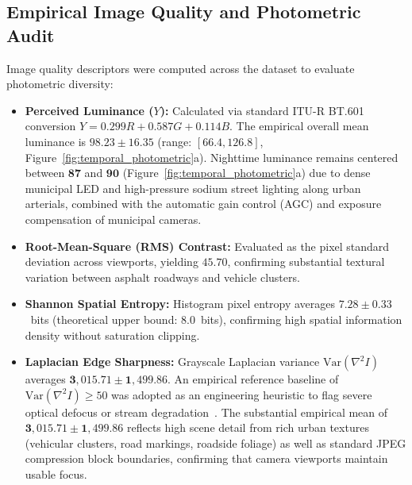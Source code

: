 \documentclass[preprint,12pt]{elsarticle}
\begin{document}
\subsection{Empirical Image Quality and Photometric Audit}
Image quality descriptors were computed across the dataset to evaluate photometric diversity:
\begin{itemize}
    \item \textbf{Perceived Luminance ($Y$):} Calculated via standard ITU-R BT.601 conversion $Y = 0.299R + 0.587G + 0.114B$. The empirical overall mean luminance is $\mathbf{98.23 \pm 16.35}$ (range: $[66.4, 126.8]$, Figure~\ref{fig:temporal_photometric}a). Nighttime luminance remains centered between $\mathbf{87}$ and $\mathbf{90}$ (Figure~\ref{fig:temporal_photometric}a) due to dense municipal LED and high-pressure sodium street lighting along urban arterials, combined with the automatic gain control (AGC) and exposure compensation of municipal cameras.
    \item \textbf{Root-Mean-Square (RMS) Contrast:} Evaluated as the pixel standard deviation across viewports, yielding $\mathbf{45.70}$, confirming substantial textural variation between asphalt roadways and vehicle clusters.
    \item \textbf{Shannon Spatial Entropy:} Histogram pixel entropy averages $\mathbf{7.28 \pm 0.33}$~bits (theoretical upper bound: $8.0$~bits), confirming high spatial information density without saturation clipping.
    \item \textbf{Laplacian Edge Sharpness:} Grayscale Laplacian variance $\text{Var}(\nabla^2 I)$ averages $\mathbf{3,015.71 \pm 1,499.86}$. An empirical reference baseline of $\text{Var}(\nabla^2 I) \ge 50$ was adopted as an engineering heuristic to flag severe optical defocus or stream degradation~\cite{pech2000diatom}. The substantial empirical mean of $\mathbf{3,015.71 \pm 1,499.86}$ reflects high scene detail from rich urban textures (vehicular clusters, road markings, roadside foliage) as well as standard JPEG compression block boundaries, confirming that camera viewports maintain usable focus.

\end{itemize}
\end{document}
